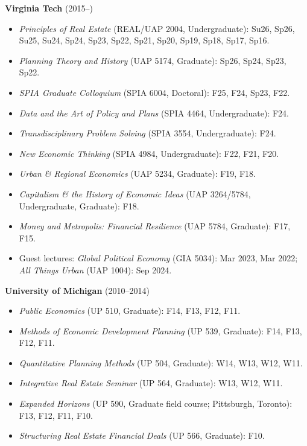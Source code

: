 \documentclass[letter,11pt]{article}
\begin{document}
\vspace{2pt}\noindent\textbf{Virginia Tech} (2015--)
\begin{itemize}[--]
\itemsep0em
    \item \emph{Principles of Real Estate} (REAL/UAP 2004, Undergraduate): Su26, Sp26, Su25, Su24, Sp24, Sp23, Sp22, Sp21, Sp20, Sp19, Sp18, Sp17, Sp16.
    \item \emph{Planning Theory and History} (UAP 5174, Graduate): Sp26, Sp24, Sp23, Sp22.
    \item \emph{SPIA Graduate Colloquium} (SPIA 6004, Doctoral): F25, F24, Sp23, F22.
    \item \emph{Data and the Art of Policy and Plans} (SPIA 4464, Undergraduate): F24.
    \item \emph{Transdisciplinary Problem Solving} (SPIA 3554, Undergraduate): F24.
    \item \emph{New Economic Thinking} (SPIA 4984, Undergraduate): F22, F21, F20.
    \item \emph{Urban \& Regional Economics} (UAP 5234, Graduate): F19, F18.
    \item \emph{Capitalism \& the History of Economic Ideas} (UAP 3264/5784, Undergraduate, Graduate): F18.
    \item \emph{Money and Metropolis: Financial Resilience} (UAP 5784, Graduate): F17, F15.
    \item Guest lectures: \emph{Global Political Economy} (GIA 5034): Mar 2023, Mar 2022; \emph{All Things Urban} (UAP 1004): Sep 2024.
\end{itemize}
\vspace{4pt}\noindent\textbf{University of Michigan} (2010--2014)
\begin{itemize}[--]
\itemsep0em
    \item \emph{Public Economics} (UP 510, Graduate): F14, F13, F12, F11.
    \item \emph{Methods of Economic Development Planning} (UP 539, Graduate): F14, F13, F12, F11.
    \item \emph{Quantitative Planning Methods} (UP 504, Graduate): W14, W13, W12, W11.
    \item \emph{Integrative Real Estate Seminar} (UP 564, Graduate): W13, W12, W11.
    \item \emph{Expanded Horizons} (UP 590, Graduate field course; Pittsburgh, Toronto): F13, F12, F11, F10.
    \item \emph{Structuring Real Estate Financial Deals} (UP 566, Graduate): F10.
\end{itemize}
\end{document}
